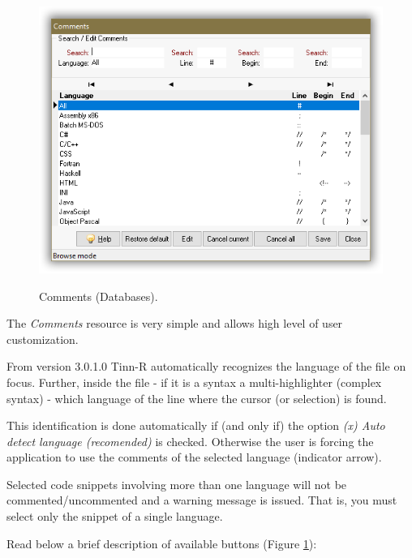 \begin{figure}[H]
  \includegraphics[scale=0.35]{./res/comments_dlg.png}\\
  \caption{Comments (Databases).}
  \label{fig:comments_dlg}
\end{figure}

The \textit{Comments} resource is very simple and allows high level
of user customization.

From version 3.0.1.0 Tinn-R automatically recognizes the
language of the file on focus. Further, inside the file
- if it is a syntax a multi-highlighter (complex syntax) - which language of
the line where the cursor (or selection) is found.

This identification is done automatically if (and only if) the option
\textit{(x) Auto detect language (recomended)} is checked. Otherwise
the user is forcing the application to use the comments of the selected language
(indicator arrow).

Selected code snippets involving more than one language will not be commented/uncommented
and a warning message is issued. That is, you must select only the snippet of a single language.

Read below a brief description of available buttons (Figure \ref{fig:comments_dlg}):

